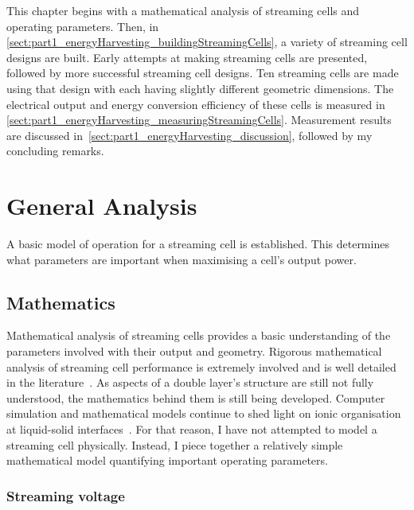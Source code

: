 
This chapter begins with a mathematical analysis of streaming cells and operating parameters.
Then, in \cref{sect:part1_energyHarvesting_buildingStreamingCells}, a variety of streaming cell designs are built.
Early attempts at making streaming cells are presented, followed by more successful streaming cell designs.
Ten streaming cells are made using that design with each having slightly different geometric dimensions.
The electrical output and energy conversion efficiency of these cells is measured in \cref{sect:part1_energyHarvesting_measuringStreamingCells}.
Measurement results are discussed in~\cref{sect:part1_energyHarvesting_discussion}, followed by my concluding remarks.


\section{General Analysis}
  \label{sect:part1_energyHarvesting_generalAnalysis}


  A basic model of operation for a streaming cell is established.
  This determines what parameters are important when maximising a cell's output power.


  \subsection{Mathematics}


    Mathematical analysis of streaming cells provides a basic understanding of the parameters involved with their output and geometry.
    Rigorous mathematical analysis of streaming cell performance is extremely involved and is well detailed in the literature~\cite{Yang1998}.
    As aspects of a double layer's structure are still not fully understood, the mathematics behind them is still being developed.
    Computer simulation and mathematical models continue to shed light on ionic organisation at liquid-solid interfaces~\cite{Kornyshev2007}.
    For that reason, I have not attempted to model a streaming cell physically.
    Instead, I piece together a relatively simple mathematical model quantifying important operating parameters.


    \subsubsection*{Streaming voltage}

